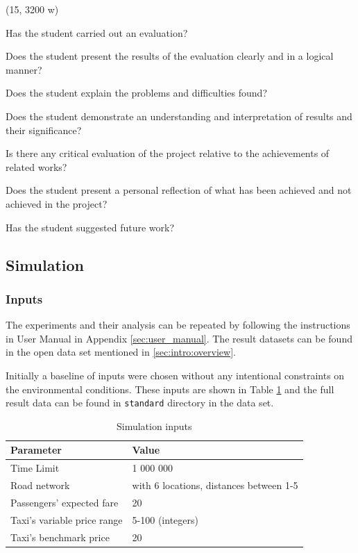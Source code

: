 (15, 3200 w)

Has the student carried out an evaluation?

Does the student present the results of the evaluation clearly and in a logical
manner?

Does the student explain the problems and difficulties found?

Does the student demonstrate an understanding and interpretation of results and
their significance?

Is there any critical evaluation of the project relative to the achievements of
related works?

Does the student present a personal reflection of what has been achieved and
not achieved in the project?

Has the student suggested future work?


\subsection{Simulation}
\label{sec:results}



\subsubsection{Inputs}

The experiments and their analysis can be repeated by following the
instructions in User Manual in Appendix \ref{sec:user_manual}. The result
datasets can be found in the open data set mentioned in
\ref{sec:intro:overview}.

Initially a baseline of inputs were chosen without any intentional constraints
on the environmental conditions. These inputs are shown in Table
\ref{table:input_data} and the full result data can be found in
\texttt{standard} directory in the data set.

\begin{table}
\begin{tabular}{ | l | l | }
  \hline
  Parameter & Value \\ \hline
  Time Limit & 1 000 000 \\
  Road network & with 6 locations, distances between 1-5 \\
  Passengers' expected fare & 20 \\
  Taxi's variable price range & 5-100 (integers) \\
  Taxi's benchmark price & 20 \\
  \hline
\end{tabular}
\caption{
  Simulation inputs
  \label{table:input_data}
}
\end{table}


